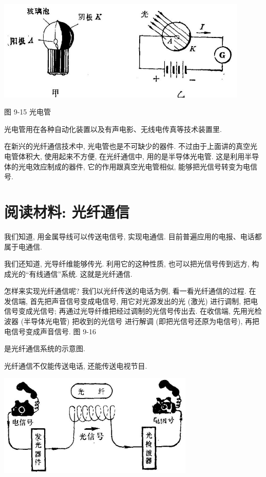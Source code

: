 \documentclass[10pt]{article}
\begin{document}
\begin{center}
\includegraphics[max width=0.9\textwidth]{images/01913056-1f15-74d8-9184-9aab52c9d66b_319_274965.jpg}
\end{center}

图 9-15 光电管

光电管用在各种自动化装置以及有声电影、无线电传真等技术装置里.

在新兴的光纤通信技术中, 光电管也是不可缺少的器件. 不过由于上面讲的真空光电管体积大, 使用起来不方便, 在光纤通信中, 用的是半导体光电管. 这是利用半导体的光电效应制成的器件, 它的作用跟真空光电管相似, 能够把光信号转变为电信号.

\section*{阅读材料: 光纤通信}

我们知道, 用金属导线可以传送电信号, 实现电通信. 目前普遍应用的电报、电话都属于电通信.

我们还知道, 光导纤维能够传光. 利用它的这种性质, 也可以把光信号传到远方, 构成光的“有线通信”系统. 这就是光纤通信.

怎样来实现光纤通信呢? 我们以光纤传送的电话为例, 看一看光纤通信的过程. 在发信端, 首先把声音信号变成电信号, 用它对光源发出的光 (激光) 进行调制, 把电信号变成光信号; 再通过光导纤维把经过调制的光信号传出去. 在收信端, 先用光检波器 (半导体光电管) 把收到的光信号 进行解调 (即把光信号还原为电信号), 再把电信号变成声音信号. 图 9-16

是光纤通信系统的示意图.

光纤通信不仅能传送电话, 还能传送电视节目.

\begin{center}
\includegraphics[max width=0.7\textwidth]{images/01913056-1f15-74d8-9184-9aab52c9d66b_321_957323.jpg}
\end{center}
\end{document}
